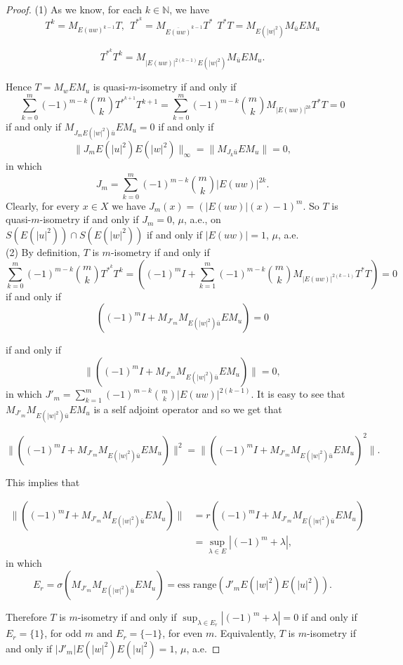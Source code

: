\documentclass[10pt,a4paper]{amsart}
\begin{document}
\begin{proof}
(1) 
As we know, for each $k\in \mathbb{N}$, we have 
$$T^k=M_{E(uw)^{k-1}}T, \ \ T^{*^k}=M_{\overline{E(uw)}^{k-1}}T^* \ \ T^*T=M_{E(|w|^2)}M_{\bar{u}}EM_u$$

$$T^{*^k}T^k=M_{|E(uw)|^{2(k-1)}E(|w|^2)}M_{\bar{u}}EM_u.$$

Hence $T=M_wEM_u$ is quasi-$m$-isometry if and only if
$$\sum_{k=0}^{m}(-1)^{m-k}\binom{m}{k}T^{*^{k+1}}T^{k+1}=\sum_{k=0}^{m}(-1)^{m-k}\binom{m}{k}M_{|E(uw)|^{2k}}T^*T=0$$
if and only if $ M_{J_mE(|w|^2)\bar{u}}EM_u=0$
if and only if $$\|J_mE(|u|^2)E(|w|^2)\|_{\infty}=\|M_{J_k\bar{u}}EM_u\|=0,$$
in which $$J_m=\sum_{k=0}^{m}(-1)^{m-k}\binom{m}{k}|E(uw)|^{2k}.$$ 
Clearly, for every $x\in X$ we have $J_m(x)=(|E(uw)|(x)-1)^m$. 
So $T$ is quasi-$m$-isometry if and only if $J_m=0$, $\mu$, a.e., on $S(E(|u|^2))\cap S(E(|w|^2))$ if and only if $|E(uw)|=1$, $\mu$, a.e.\\ 

(2) By definition, $T$ is $m$-isometry if and only if
$$\sum_{k=0}^{m}(-1)^{m-k}\binom{m}{k}T^{*^{k}}T^{k}=((-1)^mI+\sum_{k=1}^{m}(-1)^{m-k}\binom{m}{k}M_{|E(uw)|^{2(k-1)}}T^*T)=0$$
if and only if
$$((-1)^mI+M_{J'_m}M_{E(|w|^2)\bar{u}}EM_u)=0$$
 
if and only if 
$$\|((-1)^mI+M_{J'_m}M_{E(|w|^2)\bar{u}}EM_u)\|=0,$$ 
in which 
$J'_m=\sum_{k=1}^{m}(-1)^{m-k}\binom{m}{k}|E(uw)|^{2(k-1)}$.
 It is easy to see that $M_{J'_m}M_{E(|w|^2)\bar{u}}EM_u$ is a self adjoint operator and so we get that
 
$$\|((-1)^mI+M_{J'_m}M_{E(|w|^2)\bar{u}}EM_u)\|^2=\|((-1)^mI+M_{J'_m}M_{E(|w|^2)\bar{u}}EM_u)^2\|.$$

This implies that 

\begin{align*}
\|((-1)^mI+M_{J'_m}M_{E(|w|^2)\bar{u}}EM_u)\|&=r((-1)^mI+M_{J'_m}M_{E(|w|^2)\bar{u}}EM_u)\\
&=\sup_{\lambda\in E}|(-1)^m+\lambda|,
\end{align*}
 in which 
 $$E_r=\sigma(M_{J'_m}M_{E(|w|^2)\bar{u}}EM_u)=\text{ess \ range}(J'_mE(|w|^2)E(|u|^2)).$$
 
 Therefore $T$ is $m$-isometry if and only if $\sup_{\lambda\in E_r}|(-1)^m+\lambda|=0$ if and only if $E_r=\{1\}$, for odd $m$ and $E_r=\{-1\}$, for even $m$. Equivalently, $T$ is $m$-isometry if and only if $|J'_m|E(|w|^2)E(|u|^2)=1$, $\mu$, a.e.
\end{proof}
\end{document}
